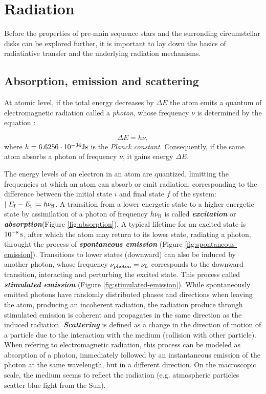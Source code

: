 \section{Radiation}

Before the properties of pre-main sequence stars and the surronding circumstellar disks can be explored further, it is important to lay down the basics of radiatiative transfer and the underlying radiation mechanisms. 

\subsection{Absorption, emission and scattering}
\label{sec:abs-em-sc}
At atomic level, if the total energy decreases by $\Delta E$ the atom emits a quantum of electromagnetic radiation called a \textit{photon}, whose frequency $\nu$ is determined by the equation \citep{Karttunen2017}:

\begin{equation}
	\Delta E = h \nu,
\end{equation}
where $h=6.6256 \cdot 10^{-34} \rm{Js}$ is the \textit{Planck constant}. Consequently, if the same atom absorbs a photon of frequency $\nu$, it gains energy $\Delta E$.

The energy levels of an electron in an atom are quantized, limitting the frequencies at which an atom can absorb or emit radiation, corresponding to the difference between the initial state $i$ and final state $f$ of the system: $\mid E_{\rm{f}} - E_{\rm{i}} \mid = h\nu_{\rm{fi}}$. A transition from a lower energetic state to a higher energetic state by assimilation of a photon of frequency $h\nu_{\rm{fi}}$ is called \textbf{\textit{excitation}} or \textbf{\textit{absorption}}(Figure \ref{fig:absorption}). A typical lifetime for an excited state is $10^{-8} \, \rm{s}$, after which the atom may return to its lower state, radiating a photon, throught the process of \textbf{\textit{spontaneous emission}} (Figure \ref{fig:spontaneous-emission}). Transitions to lower states (downward) can also be induced by another photon, whose frequency $\nu_{\rm{photon}} = \nu_{\rm{fi}}$ corresponds to the downward transition, interacting and perturbing the excited state. This process called \textbf{\textit{stimulated emission}} (Figure \ref{fig:stimulated-emission}). While spontaneously emitted photons have randomly distributed phases and directions when leaving the atom, producing an incoherent radiation, the radiation produce through stimulated emission is coherent and propagates in the same direction as the induced radiation. \textbf{\textit{Scattering}} is defined as a change in the direction of motion of a particle due to the interaction with the medium (collision with other particle). When refering to electromagnetic radiation, this process can be modeled as absorption of a photon, immediately followed by an instantaneous emission of the photon at the same wavelength, but in a different direction. On the macroscopic scale, the medium seems to reflect the radiation (e.g. atmospheric particles scatter blue light from the Sun). 

